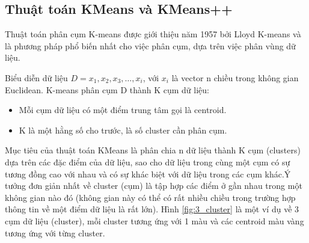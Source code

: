 \documentclass[a4paper]{article}
\begin{document}
\subsection{Thuật toán KMeans và KMeans++}
Thuật toán phân cụm K-means được giới thiệu năm 1957 bởi Lloyd K-means và là phương pháp phổ biến nhất cho việc phân cụm, dựa trên việc phân vùng dữ liệu.

Biểu diễn dữ liệu $D={x_1, x_2, x_3, \dots, x_i}$, với $x_i$ là vector n chiều trong không gian Euclidean. K-means phân cụm D thành K cụm dữ liệu:
\begin{itemize}
    \item Mỗi cụm dữ liệu có một điểm trung tâm gọi là centroid.
    \item K là một hằng số cho trước, là số cluster cần phân cụm. 
\end{itemize}
Mục tiêu của thuật toán KMeans là phân chia n dữ liệu thành K cụm (clusters) dựa trên các đặc điểm của dữ liệu, sao cho dữ liệu trong cùng một cụm có sự tương đồng cao với nhau và có sự
khác biệt với dữ liệu trong các cụm khác.Ý tưởng đơn giản nhất về cluster (cụm) là tập hợp các điểm ở gần nhau trong một không gian nào đó (không gian này có thể có rất nhiều chiều trong trường hợp thông tin về một điểm dữ liệu là rất lớn). Hình \ref{fig:3_cluster} là một ví dụ về 3 cụm dữ liệu (cluster), mỗi cluster tương ứng với 1 màu và các centroid màu vàng tương ứng với từng cluster.
\end{document}
